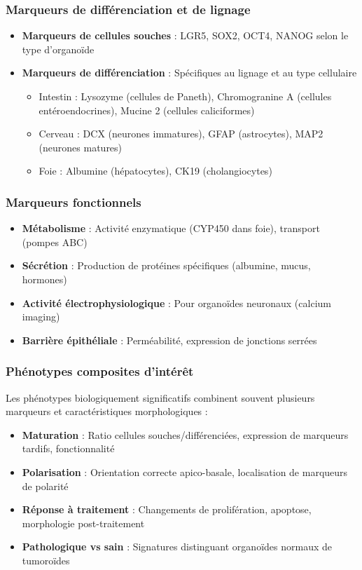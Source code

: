 \subsubsection{Marqueurs de différenciation et de lignage}

\begin{itemize}
    \item \textbf{Marqueurs de cellules souches} : LGR5, SOX2, OCT4, NANOG selon le type d'organoïde
    \item \textbf{Marqueurs de différenciation} : Spécifiques au lignage et au type cellulaire
    \begin{itemize}
        \item Intestin : Lysozyme (cellules de Paneth), Chromogranine A (cellules entéroendocrines), Mucine 2 (cellules caliciformes)
        \item Cerveau : DCX (neurones immatures), GFAP (astrocytes), MAP2 (neurones matures)
        \item Foie : Albumine (hépatocytes), CK19 (cholangiocytes)
    \end{itemize}
\end{itemize}

\subsubsection{Marqueurs fonctionnels}

\begin{itemize}
    \item \textbf{Métabolisme} : Activité enzymatique (CYP450 dans foie), transport (pompes ABC)
    \item \textbf{Sécrétion} : Production de protéines spécifiques (albumine, mucus, hormones)
    \item \textbf{Activité électrophysiologique} : Pour organoïdes neuronaux (calcium imaging)
    \item \textbf{Barrière épithéliale} : Perméabilité, expression de jonctions serrées
\end{itemize}

\subsubsection{Phénotypes composites d'intérêt}

Les phénotypes biologiquement significatifs combinent souvent plusieurs marqueurs et caractéristiques morphologiques :
\begin{itemize}
    \item \textbf{Maturation} : Ratio cellules souches/différenciées, expression de marqueurs tardifs, fonctionnalité
    \item \textbf{Polarisation} : Orientation correcte apico-basale, localisation de marqueurs de polarité
    \item \textbf{Réponse à traitement} : Changements de prolifération, apoptose, morphologie post-traitement
    \item \textbf{Pathologique vs sain} : Signatures distinguant organoïdes normaux de tumoroïdes
\end{itemize}

